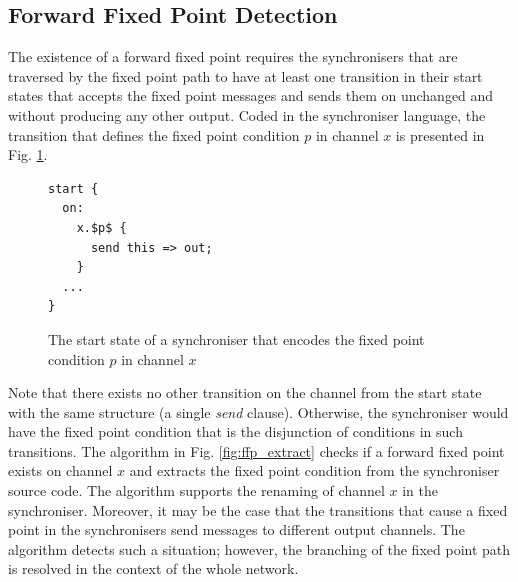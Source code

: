 
    \subsection{Forward Fixed Point Detection}
The existence of a forward fixed point requires the synchronisers that are traversed by the fixed point path to have at least one transition in their start states that accepts the fixed point messages and sends them on unchanged and without producing any other output. Coded in the synchroniser language, the transition that defines the fixed point condition $p$ in channel $x$ is presented in Fig. \ref{ffp:synch_fp}.
\begin{figure}[h!]
\begin{lstlisting}[frame=single,mathescape]
start {
  on:
    x.$p$ {
      send this => out;
    }
  ...
}
\end{lstlisting}
\caption{The start state of a synchroniser that encodes the fixed point condition $p$ in channel $x$}
\label{ffp:synch_fp}
\end{figure}

Note that there exists no other transition on the channel from the start state with the same structure (a single \emph{send} clause). Otherwise, the synchroniser would have the fixed point condition that is the disjunction of conditions in such transitions. The algorithm in Fig. \ref{fig:ffp_extract} checks if a forward fixed point exists on channel $x$ and extracts the fixed point condition from the synchroniser source code. The algorithm supports the renaming of channel $x$ in the synchroniser. Moreover, it may be the case that the transitions that cause a fixed point in the synchronisers send messages to different output channels. The algorithm detects such a situation; however, the branching of the fixed point path is resolved in the context of the whole network.

